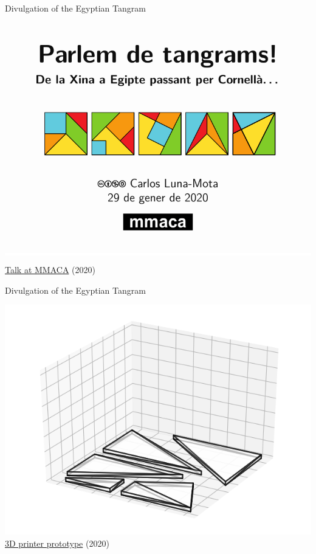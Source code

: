 \documentclass[14pt]{beamer}
\begin{document}

    \begin{frame}{Divulgation of the Egyptian Tangram}
        \begin{center}
            \colorbox{white}{\includegraphics[height=25ex]{pictures/Parlem de tangrams - p01.pdf}} \\\bigskip

            \href{https://github.com/CarlosLunaMota/The-Egyptian-Tangram}{Talk at MMACA} (2020)
        \end{center}
    \end{frame}


    \begin{frame}{Divulgation of the Egyptian Tangram}
        \begin{center}
            \vspace{-3ex}
            {\includegraphics[height=30ex]{pictures/Egyptian Tangram STL.png}} \\

            \href{https://github.com/CarlosLunaMota/The-Egyptian-Tangram}{3D printer prototype} (2020)
        \end{center}
    \end{frame}

\end{document}
